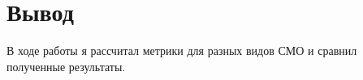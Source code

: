 \chapter{Вывод}
\label{ch:сhap5}

В ходе работы я рассчитал метрики для разных видов СМО и сравнил полученные результаты.


\endinput